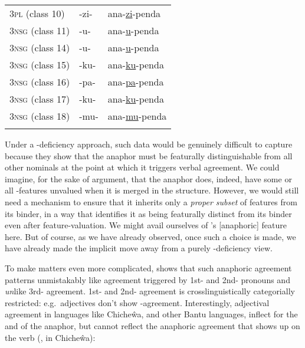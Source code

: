 \documentclass[output=paper, modfonts, nonflat]{langsci/langscibook}
\begin{document}
\begin{table}
\begin{tabularx}{\textwidth}{XXX}
  \textsc{3pl} (class 10) & -zi- & ana-\ul{zi}-penda\\
  \textsc{3nsg} (class 11) & -u- & ana-\ul{u}-penda\\
  \textsc{3nsg} (class 14) & -u- & ana-\ul{u}-penda\\
  \textsc{3nsg} (class 15) & -ku- & ana-\ul{ku}-penda\\
  \textsc{3nsg} (class 16) & -pa- & ana-\ul{pa}-penda\\
  \textsc{3nsg} (class 17) & -ku- & ana-\ul{ku}-penda\\
  \textsc{3nsg} (class 18) & -mu- & ana-\ul{mu}-penda\\
   \lspbottomrule
\end{tabularx}
\end{table}

\noindent Under a \ph-deficiency approach, such data would be genuinely
difficult to capture because they show that the anaphor must be
featurally distinguishable from all other nominals at the point at
which it triggers verbal agreement. We could imagine, for the sake of
argument, that the anaphor does, indeed, have some or all \ph-features
unvalued when it is merged in the structure. However, we would still
need a mechanism to ensure that it inherits only a \emph{proper
  subset} of features from its binder, in a way that identifies it as
being featurally distinct from its binder even after
feature-valuation. We might avail ourselves of \citet{kratzer:2009}'s
[anaphoric] feature here. But of course, as we have already observed,
once such a choice is made, we have already made the implicit move
away from a purely \ph-deficiency view.

To make matters even more complicated, \citet{baker:2008} shows that
such anaphoric agreement patterns unmistakably like agreement
triggered by 1st- and 2nd-\person{} pronouns and \emph{un}like
3rd-\person{} agreement. 1st- and 2nd-\person{} agreement is
crosslinguistically categorially restricted: e.g.\ adjectives don't
show \person-agreement. Interestingly, adjectival agreement in
languages like Chi\-che\-ŵa, and other Bantu languages, inflect for
the \num{} and \gender{} of the anaphor, but cannot reflect the
anaphoric agreement that shows up on the verb (\citealt[150--151, 86a--b]{baker:2008}, in Chicheŵa):
\end{document}
